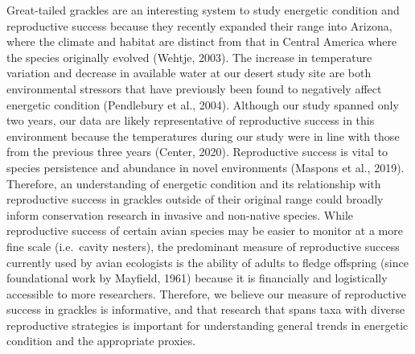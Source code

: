\documentclass[
]{article}
\begin{document}
Great-tailed grackles are an interesting system to study energetic
condition and reproductive success because they recently expanded their
range into Arizona, where the climate and habitat are distinct from that
in Central America where the species originally evolved (Wehtje, 2003).
The increase in temperature variation and decrease in available water at
our desert study site are both environmental stressors that have
previously been found to negatively affect energetic condition
(Pendlebury et al., 2004). Although our study spanned only two years,
our data are likely representative of reproductive success in this
environment because the temperatures during our study were in line with
those from the previous three years (Center, 2020). Reproductive success
is vital to species persistence and abundance in novel environments
(Maspons et al., 2019). Therefore, an understanding of energetic
condition and its relationship with reproductive success in grackles
outside of their original range could broadly inform conservation
research in invasive and non-native species. While reproductive success
of certain avian species may be easier to monitor at a more fine scale
(i.e.~cavity nesters), the predominant measure of reproductive success
currently used by avian ecologists is the ability of adults to fledge
offspring (since foundational work by Mayfield, 1961) because it is
financially and logistically accessible to more researchers. Therefore,
we believe our measure of reproductive success in grackles is
informative, and that research that spans taxa with diverse reproductive
strategies is important for understanding general trends in energetic
condition and the appropriate proxies.
\end{document}
